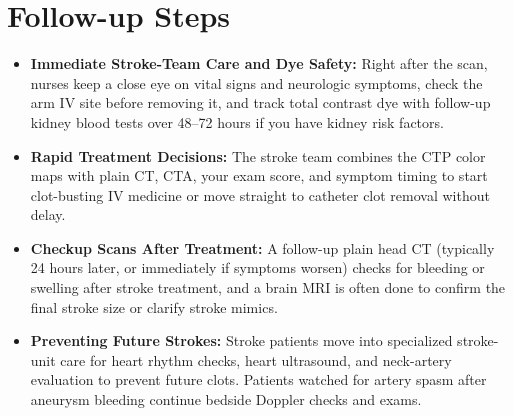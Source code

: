 \section{Follow-up Steps}
\begin{itemize}
    \item \textbf{Immediate Stroke-Team Care and Dye Safety:} Right after the scan, nurses keep a close eye on vital signs and neurologic symptoms, check the arm IV site before removing it, and track total contrast dye with follow-up kidney blood tests over 48--72 hours if you have kidney risk factors.
    \item \textbf{Rapid Treatment Decisions:} The stroke team combines the CTP color maps with plain CT, CTA, your exam score, and symptom timing to start clot-busting IV medicine or move straight to catheter clot removal without delay.
    \item \textbf{Checkup Scans After Treatment:} A follow-up plain head CT (typically 24 hours later, or immediately if symptoms worsen) checks for bleeding or swelling after stroke treatment, and a brain MRI is often done to confirm the final stroke size or clarify stroke mimics.
    \item \textbf{Preventing Future Strokes:} Stroke patients move into specialized stroke-unit care for heart rhythm checks, heart ultrasound, and neck-artery evaluation to prevent future clots. Patients watched for artery spasm after aneurysm bleeding continue bedside Doppler checks and exams.
\end{itemize}

